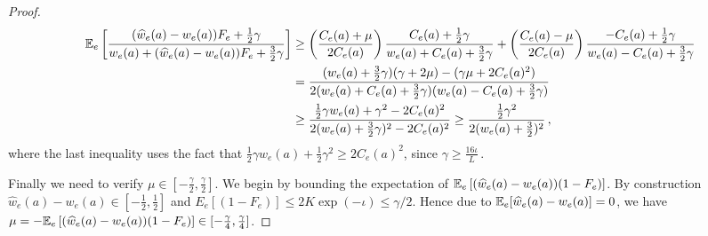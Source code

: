 \begin{proof}
\begin{align*}
    \mathbb{E}_{e}\left[\frac{(\widehat{w}_{e}(a)-w_{e}(a))F_e +\frac{1}{2}\gamma}{w_{e}(a)+(\widehat{w}_{e}(a)-w_{e}(a))F_e+\frac{3}{2}\gamma}\right] &\geq \left(\frac{C_{e}(a)+\mu}{2C_{e}(a)}\right)\frac{C_{e}(a)+\frac{1}{2}\gamma}{w_{e}(a)+C_{e}(a)+\frac{3}{2}\gamma}+\left(\frac{C_{e}(a)-\mu}{2C_{e}(a)}\right)\frac{-C_{e}(a)+\frac{1}{2}\gamma}{w_{e}(a)-C_{e}(a)+\frac{3}{2}\gamma}\\
    &=\frac{(w_{e}(a)+\frac{3}{2}\gamma)(\gamma+2\mu)-(\gamma\mu+2C_{e}(a)^2)}{2(w_{e}(a)+C_{e}(a)+\frac{3}{2}\gamma)(w_{e}(a)-C_{e}(a)+\frac{3}{2}\gamma)}\\
    &\geq\frac{\frac{1}{2}\gamma w_{e}(a)+\gamma^2-2C_{e}(a)^2}{2(w_{e}(a)+\frac{3}{2}\gamma)^2-2C_{e}(a)^2}\geq \frac{\frac{1}{2}\gamma^2}{2(w_{e}(a)+\frac{3}{2})^2}\,,
\end{align*}
where the last inequality uses the fact that  $\frac{1}{2}\gamma w_{e}(a)+\frac{1}{2}\gamma^2\geq 2C_{e}(a)^2$, since $\gamma\geq \frac{16\iota}{L}$\,.

Finally we need to verify $\mu\in[-\frac{\gamma}{2},\frac{\gamma}{2}]$.
We begin by bounding the expectation of $\mathbb{E}_{e}\left[(\widehat{w}_{e}(a)-w_{e}(a))(1-F_e)\right]$.
By construction $\widehat{w}_{e}(a)-w_{e}(a)\in[-\frac{1}{2},\frac{1}{2}]$ and $E_{e}[(1-F_e)]\le 2K\exp(-\iota)\le \gamma/2$. Hence
due to $\mathbb{E}_{e}[\widehat{w}_{e}(a)-w_{e}(a)]=0$, we have
$\mu = - \mathbb{E}_{e}\left[(\widehat{w}_{e}(a)-w_{e}(a))(1-F_e)\right]\in[-\frac{\gamma}{4},\frac{\gamma}{4}]$.
\end{proof}

